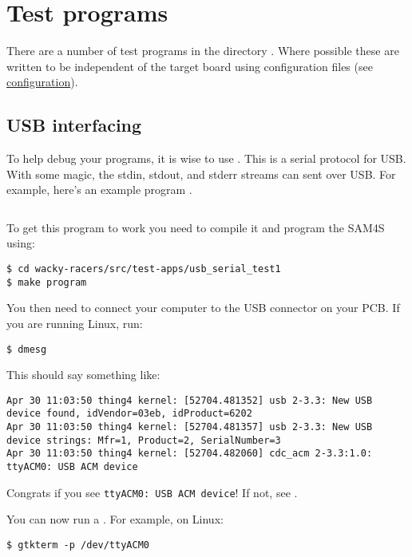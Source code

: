 \chapter{Test programs}
\label{test-programs}

There are a number of test programs in the directory
.  Where possible these are written to be
independent of the target board using configuration files (see
\protect\hyperref[configuration]{configuration}).


\section{USB interfacing}
\label{usb-interfacing}

To help debug your programs, it is wise to use .  This is a serial protocol for USB.  With some magic, the
stdin, stdout, and stderr streams can sent over USB.  For example,
here's an example program
.

\inputminted{C}{../../src/test-apps/usb_serial_test1/usb_serial_test1.c}

To get this program to work you need to compile it and program the
SAM4S using:
%
\begin{verbatim}
$ cd wacky-racers/src/test-apps/usb_serial_test1
$ make program
\end{verbatim}

You then need to connect your computer to the USB connector on your PCB.
If you are running Linux, run:
%
\begin{verbatim}
$ dmesg
\end{verbatim}

This should say something like:
%
\begin{verbatim}
Apr 30 11:03:50 thing4 kernel: [52704.481352] usb 2-3.3: New USB device found, idVendor=03eb, idProduct=6202
Apr 30 11:03:50 thing4 kernel: [52704.481357] usb 2-3.3: New USB device strings: Mfr=1, Product=2, SerialNumber=3
Apr 30 11:03:50 thing4 kernel: [52704.482060] cdc_acm 2-3.3:1.0: ttyACM0: USB ACM device
\end{verbatim}

Congrats if you see \texttt{ttyACM0:\ USB\ ACM\ device}!  If not, see
.

You can now run a . For example, on Linux:
%
\begin{verbatim}
$ gtkterm -p /dev/ttyACM0
\end{verbatim}

